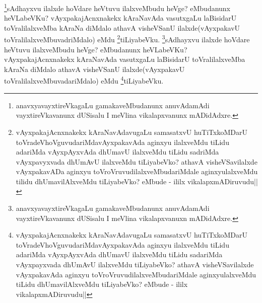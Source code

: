 \begin{artha}
\footnote{anavxyavayxtireVkagaLu gamakaveMbudanunx anuvAdamAdi vayxtireVkavanunx dUSisalu I meVlina vikalapxvanunx mADidAdxre.}sAdhayxvu ilalxde hoVdare heVtuvu ilalxveMbudu heVge? eMbudanunx heVLabeVKu? vAyxpakajAcnxnakekx kAraNavAda vasutxgaLu laBisidarU toVralilalxveMba kAraNa diMdalo athavA visheVSanU ilalxde(vAyxpakavU toVralilalxveMbuvadriMdalo) eMdu \footnote{vAyxpakajAcnxnakekx kAraNavAdavugaLu  samasatxvU huTiTxkoMDarU toVradeVhoVguvudariMdavAyxpakavAda aginxyu ilalxveMdu tiLidu adariMda vAyxpAyxvAda dhUmavU ilalxveMdu tiLidu sadriMda vAyxpavyxvada dhUmAvU ilalxveMdu tiLiyabeVko? athavA visheVSavilalxde vAyxpakavADa aginxyu toVroVruvudilalxveMbudariMdale aginxyulalxveMdu tilidu dhUmavilAlxveMdu tiLiyabeVko? eMbude - ililx vikalapxmADiruvudu||}tiLiyabeVku.
\footnote{anavxyavayxtireVkagaLu gamakaveMbudanunx anuvAdamAdi vayxtireVkavanunx dUSisalu I meVlina vikalapxvanuxn mADidAdxre.}sAdhayxvu ilalxde hoVdare heVtuvu ilalxveMbudu heVge? eMbudanunx heVLabeVKu? vAyxpakajAcnxnakekx kAraNavAda vasutxgaLu laBisidarU toVralilalxveMba kAraNa diMdalo athavA visheVSanU ilalxde(vAyxpakavU toVralilalxveMbuvadariMdalo) eMdu \footnote{vAyxpakajAcnxnakekx kAraNavAdavugaLu  samasatxvU huTiTxkoMDarU toVradeVhoVguvudariMdavAyxpakavAda aginxyu ilalxveMdu tiLidu adariMda vAyxpAyxvAda dhUmavU ilalxveMdu tiLidu sadariMda vAyxpayxvada dhUmAvU ilalxveMdu tiLiyabeVko? athavA visheVSavilalxde vAyxpakavAda aginxyu toVroVruvudilalxveMbudariMdale aginxyulalxveMdu tiLidu dhUmavilAlxveMdu tiLiyabeVko? eMbude - ililx vikalapxmADiruvudu||}tiLiyabeVku.
\end{artha}

